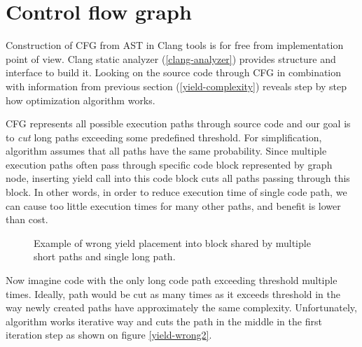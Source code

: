 \section{Control flow graph}
Construction of CFG from AST in Clang tools is for free from implementation point of view. Clang static analyzer (\ref{clang-analyzer}) provides structure and interface to build it. Looking on the source code through CFG in combination with information from previous section (\ref{yield-complexity}) reveals step by step how optimization algorithm works.

CFG represents all possible execution paths through source code and our goal is to \textit{cut} long paths exceeding some predefined threshold. For simplification, algorithm assumes that all paths have the same probability. Since multiple execution paths often pass through specific code block represented by graph node, inserting yield call into this code block cuts all paths passing through this block. In other words, in order to reduce execution time of single code path, we can cause too little execution times for many other paths, and benefit is lower than cost. 

\begin{figure}[h!]
\caption{Example of wrong yield placement into block shared by multiple short paths and single long path.}
\label{yield-wrong1}
\centering
\vspace{0.5cm}
\end{figure}

Now imagine code with the only long code path exceeding threshold multiple times. Ideally, path would be cut as many times as it exceeds threshold in the way newly created paths have approximately the same complexity. Unfortunately, algorithm works iterative way and cuts the path in the middle in the first iteration step as shown on figure \ref{yield-wrong2}.

